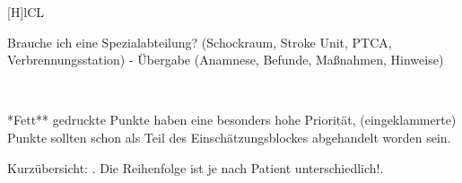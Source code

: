 {\begin{minipage}{\linewidth}
{\begin{tabulary}{\linewidth}[H]{lCL}
\begin{minipage}{\linewidth}
\begin{itemize}
  Brauche ich eine Spezialabteilung? {\tiny(Schockraum, Stroke
  Unit, PTCA, Verbrennungsstation)}
  -   Übergabe {\tiny(Anamnese, Befunde, Maßnahmen, Hinweise)}
\end{itemize}
\end{minipage}

\\\addlinespace\bottomrule
\end{tabulary}}

{\scriptsize**Fett** gedruckte Punkte haben eine besonders hohe Priorität, (eingeklammerte) Punkte sollten schon als Teil des Einschätzungsblockes abgehandelt worden sein.}
\end{minipage}
}
{Kurzübersicht: .
Die Reihenfolge ist je nach Patient
unterschiedlich!\label{tab:checkliste-patientenmanagement}\label{tab:pam-weiterfuehrende}.}
{}
